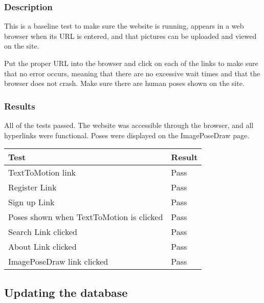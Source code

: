 \documentclass{scrreprt}
\begin{document}
\subsubsection{Description}

This is a baseline test to make sure the website is running, appears in a web
browser when its URL is entered, and that pictures can be uploaded and
viewed on the site.

Put the proper URL into the browser and click on each of the links to make sure
that no error occurs, meaning that there are no excessive wait times and that
the browser does not crash. Make sure there are human poses shown on the site.

\subsubsection{Results}

All of the tests passed. The website was accessible through the browser, and
all hyperlinks were functional. Poses were displayed on the ImagePoseDraw page.

\begin{table}[H]
        \centering
        \begin{tabular}{||p{5cm}|p{2.5cm}||}
                \hline
                \textbf Test & \textbf Result\\
                \hline\hline
                TextToMotion link & Pass  \\
                \hline
                Register Link & Pass  \\
                \hline
                Sign up Link & Pass  \\
                \hline
                Poses shown when TextToMotion is clicked & Pass  \\
                \hline
                Search Link clicked & Pass  \\
                \hline
                About Link clicked & Pass  \\
                \hline
                ImagePoseDraw link clicked & Pass  \\
                \hline
        \end{tabular}
\end{table}

\subsection{Updating the database}
\end{document}
